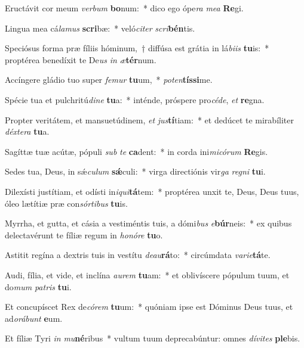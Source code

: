 \item Eructávit cor meum \textit{ver}\textit{bum} \textbf{bo}num:~* dico ego ópe\textit{ra} \textit{me}\textit{a} \textbf{Re}gi.
\item Lingua mea cá\textit{la}\textit{mus} \textbf{scri}bæ:~* veló\textit{ci}\textit{ter} \textit{scri}\textbf{bén}tis.
\item Speciósus forma præ fíliis hóminum,~† diffúsa est grátia in lá\textit{bi}\textit{is} \textbf{tu}is:~* proptérea benedíxit te De\textit{us} \textit{in} \textit{æ}\textbf{tér}num.
\item Accíngere gládio tuo super \textit{fe}\textit{mur} \textbf{tu}um,~* \textit{pot}\textit{en}\textbf{tís}\textbf{si}me.
\item Spécie tua et pulchritú\textit{di}\textit{ne} \textbf{tu}a:~* inténde, próspere pro\textit{cé}\textit{de}, \textit{et} \textbf{re}gna.
\item Propter veritátem, et mansuetúdinem, \textit{et} \textit{jus}\textbf{tí}tiam:~* et dedúcet te mirabíliter \textit{déx}\textit{te}\textit{ra} \textbf{tu}a.
\item Sagíttæ tuæ acútæ, pópuli \textit{sub} \textit{te} \textbf{ca}dent:~* in corda ini\textit{mi}\textit{có}\textit{rum} \textbf{Re}gis.
\item Sedes tua, Deus, in sǽ\textit{cu}\textit{lum} \textbf{sǽ}culi:~* virga directiónis vir\textit{ga} \textit{re}\textit{gni} \textbf{tu}i.
\item Dilexísti justítiam, et odísti in\textit{i}\textit{qui}\textbf{tá}tem:~* proptérea unxit te, Deus, Deus tuus, óleo lætítiæ præ con\textit{sór}\textit{ti}\textit{bus} \textbf{tu}is.
\item Myrrha, et gutta, et cásia a vestiméntis tuis, a dómi\textit{bus} \textit{e}\textbf{búr}neis:~* ex quibus delectavérunt te fíliæ regum in \textit{ho}\textit{nó}\textit{re} \textbf{tu}o.
\item Astitit regína a dextris tuis in vestítu \textit{de}\textit{au}\textbf{rá}to:~* circúmdata \textit{va}\textit{ri}\textit{e}\textbf{tá}te.
\item Audi, fília, et vide, et inclína \textit{au}\textit{rem} \textbf{tu}am:~* et oblivíscere pópulum tuum, et do\textit{mum} \textit{pa}\textit{tris} \textbf{tu}i.
\item Et concupíscet Rex de\textit{có}\textit{rem} \textbf{tu}um:~* quóniam ipse est Dóminus Deus tuus, et ad\textit{o}\textit{rá}\textit{bunt} \textbf{e}um.
\item Et fíliæ Tyri \textit{in} \textit{mu}\textbf{né}ribus~* vultum tuum deprecabúntur: omnes \textit{dí}\textit{vi}\textit{tes} \textbf{ple}bis.
